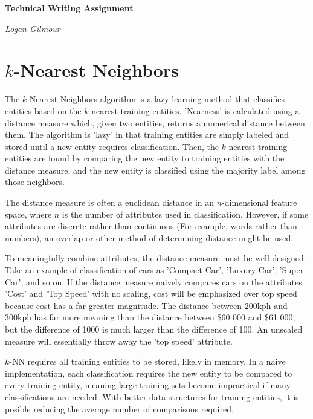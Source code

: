 \documentclass{article}
\begin{document}
\textbf{Technical Writing Assignment} 

\textit{Logan Gilmour}

\section*{\(k\)-Nearest Neighbors}
The \(k\)-Nearest Neighbors algorithm is a lazy-learning method that classifies entities based on the \(k\)-nearest training entities. 'Nearness' is calculated using a distance measure which, given two entities, returns a numerical distance between them. The algorithm is 'lazy' in that training entities are simply labeled and stored until a new entity requires classification. Then, the \(k\)-nearest training entities are found by comparing the new entity to training entities with the distance measure, and the new entity is classified using the majority label among those neighbors.

The distance measure is often a euclidean distance in an \(n\)-dimensional feature space, where \(n\) is the number of attributes used in classification. However, if some attributes are discrete rather than continuous (For example, words rather than numbers), an overlap or other method of determining distance might be used. 

To meaningfully combine attributes, the distance measure must be well designed. Take an example of classification of cars as 'Compact Car', 'Luxury Car', 'Super Car', and so on. If the distance measure naively compares cars on the attributes 'Cost' and 'Top Speed' with no scaling, cost will be emphasized over top speed because cost has a far greater magnitude. The distance between 200kph and 300kph has far more meaning than the distance between \$60 000 and \$61 000, but the difference of 1000 is much larger than the difference of 100. An unscaled measure will essentially throw away the 'top speed' attribute.

\(k\)-NN requires all training entities to be stored, likely in memory. In a naive implementation, each classification requires the new entity to be compared to every training entity, meaning large training sets become impractical if many classifications are needed. With better data-structures for training entities, it is posible reducing the average number of comparisons required.
\end{document}
